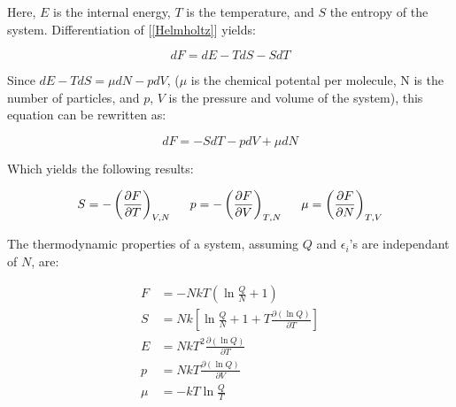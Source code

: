 \documentclass[10pt]{article}
\begin{document}
\begin{flushleft}
\begin{definition}
    Here, $E$ is the internal energy, $T$ is the temperature, and $S$ the entropy of the system. Differentiation of [\ref{Helmholtz}] yields:

    \begin{equation}
        dF = dE - TdS - SdT
    \end{equation}

    Since $dE - TdS = \mu dN - p dV$, ($\mu$ is the chemical potental per molecule, N is the number of particles, and $p$, $V$ is the pressure and volume of the system), this equation can be rewritten as:

    \begin{equation}
        dF = -SdT - pdV + \mu dN
    \end{equation}

    Which yields the following results:

    \begin{equation}
        S = - \left( \frac{\partial F}{\partial T} \right)_{V, N} \hspace{5mm} p = - \left( \frac{\partial F}{\partial V} \right)_{T, N} \hspace{5mm} \mu = \left( \frac{\partial F}{\partial N} \right)_{T, V}
    \end{equation}
    
\end{definition}

\begin{definition}
    The thermodynamic properties of a system, assuming $Q$ and $\epsilon_i$'s are independant of $N$, are:

    \begin{subequations}
        \begin{align}
            F &= -NkT \left(\ln \frac{Q}{N} + 1 \right)
            \\ S &= Nk \left[ \ln \frac{Q}{N} + 1 + T \frac{\partial(\ln Q)}{\partial T} \right]
            \\ E &= NkT^2 \frac{\partial (\ln Q)}{\partial T}
            \\ p &= NkT \frac{\partial (\ln Q)}{\partial V}
            \\ \mu &= -kT \ln \frac{Q}{T}
        \end{align}
    \end{subequations}
\end{definition}

\begin{definition}


\end{definition}
\end{flushleft}
\end{document}
